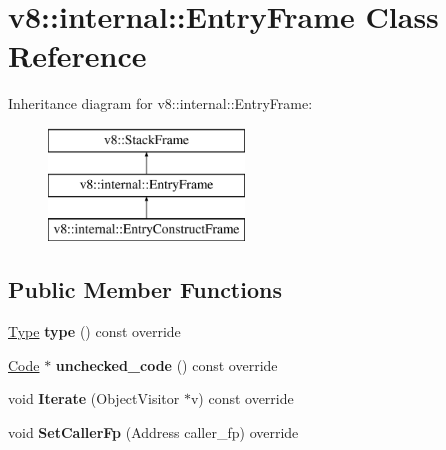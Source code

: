 \hypertarget{classv8_1_1internal_1_1_entry_frame}{}\section{v8\+:\+:internal\+:\+:Entry\+Frame Class Reference}
\label{classv8_1_1internal_1_1_entry_frame}
Inheritance diagram for v8\+:\+:internal\+:\+:Entry\+Frame\+:\begin{figure}[H]
\begin{center}
\leavevmode
\includegraphics[height=3.000000cm]{classv8_1_1internal_1_1_entry_frame}
\end{center}
\end{figure}
\subsection*{Public Member Functions}
\begin{DoxyCompactItemize}
\item 
\hyperlink{classv8_1_1internal_1_1_type}{Type} {\bfseries type} () const  override\hypertarget{classv8_1_1internal_1_1_entry_frame_af557cfecddd54e058dd379c675878462}{}\label{classv8_1_1internal_1_1_entry_frame_af557cfecddd54e058dd379c675878462}

\item 
\hyperlink{classv8_1_1internal_1_1_code}{Code} $\ast$ {\bfseries unchecked\+\_\+code} () const  override\hypertarget{classv8_1_1internal_1_1_entry_frame_a127982f4f72add274c299c39a9d287d8}{}\label{classv8_1_1internal_1_1_entry_frame_a127982f4f72add274c299c39a9d287d8}

\item 
void {\bfseries Iterate} (Object\+Visitor $\ast$v) const  override\hypertarget{classv8_1_1internal_1_1_entry_frame_abb7a322c5bb6b7ad3eb3a6e68f3a0a05}{}\label{classv8_1_1internal_1_1_entry_frame_abb7a322c5bb6b7ad3eb3a6e68f3a0a05}

\item 
void {\bfseries Set\+Caller\+Fp} (Address caller\+\_\+fp) override\hypertarget{classv8_1_1internal_1_1_entry_frame_a7f14aa4b9ff3b632d86a1b8028d92ae3}{}\label{classv8_1_1internal_1_1_entry_frame_a7f14aa4b9ff3b632d86a1b8028d92ae3}

\end{DoxyCompactItemize}
